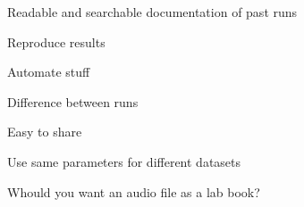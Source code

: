 Readable and searchable documentation of past runs

Reproduce results

Automate stuff

Difference between runs

Easy to share

Use same parameters for different datasets

Whould you want an audio file as a lab book?
